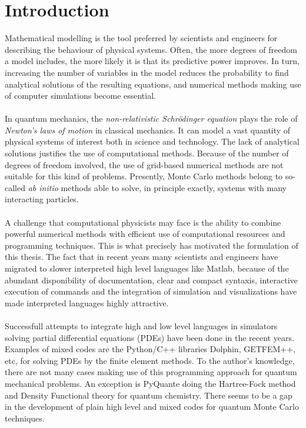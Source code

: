 \chapter{Introduction}

Mathematical modelling is the tool preferred by scientists and engineers for describing the behaviour of physical systems. Often, the more degrees of freedom a model includes, the more likely it is that its predictive power improves. In turn, increasing the number of variables in the model reduces the probability to find analytical solutions of the resulting equations, and  numerical methods making use of computer simulations become essential.\\
\\
In quantum mechanics, the \emph{non-relativistic Schr\"odinger equation} plays the role of \emph{Newton's laws of motion} in classical mechanics. It can model a vast quantity of physical systems of interest both in science and technology. The lack of analytical solutions justifies the use of computational methods. Because of the number of degrees of freedom involved, the use of grid-based numerical methods are not suitable for this kind of problems. Presently, Monte Carlo methods  belong to so-called \emph{ab initio} methods able to solve, in principle exactly, systems with many interacting particles.\\
\\
A challenge that computational physicists may face is the ability to combine powerful numerical methods with efficient use of computational resources and programming techniques. This is what precisely has motivated the formulation of this thesis. The fact that in recent years many scientists and engineers have migrated to slower interpreted high level languages like Matlab, because of the abundant disponibility of documentation, clear and compact syntaxis, interactive execution of commands and the integration of simulation and visualizations have made interpreted languages highly attractive.\\
\\
Successfull attempts to integrate high and low level languages in simulators solving partial differential equations (PDEs) have been done in the recent years. Examples of mixed codes are the Python/C++ libraries Dolphin\cite{fenics,DupHof2003}, GETFEM++\cite{getfem}, etc, for solving PDEs by the finite element methods. To the author's knowledge, there are not many cases making use of this programming approach for quantum mechanical problems. An exception is PyQuante\cite{Muller2009} doing the Hartree-Fock method and Density Functional theory for quantum chemistry. There seems to be a gap in the development of plain high level and mixed codes for quantum Monte Carlo techniques.\\
